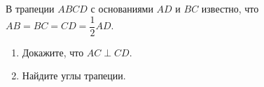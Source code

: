 \begin{ex}
	\begin{condition}
		В трапеции \( ABCD  \) с основаниями \( AD  \) и \( BC  \) известно, что \( AB=BC=CD=\dfrac{1}{2}AD \).
		\begin{enumerate}
		\item  Докажите, что \( AC\perp CD \).
		\item Найдите углы трапеции.
	\end{enumerate}
	\end{condition}
\end{ex}